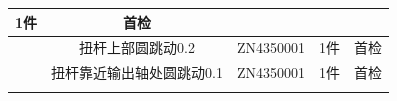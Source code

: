 \documentclass[UTF8]{ctexart}
\begin{document}
\begin{boxedminipage}{184.6mm}
\begin{tabular}{|c|c|c|c|c|}
\parbox[c][][s]{20.58mm}{\raggedright \smallskip 1件\smallskip}&
\parbox[c][][s]{20.58mm}{\raggedright \smallskip 首检\smallskip}\\
\hline
\parbox[c][][s]{9.29mm}{\raggedright {}\smallskip}&
\parbox[c][][s]{77.01mm}{\raggedright \smallskip 扭杆上部圆跳动0.2\smallskip}&
\parbox[c][][s]{43.15mm}{\raggedright \smallskip ZN4350001\smallskip}&
\parbox[c][][s]{20.58mm}{\raggedright \smallskip 1件\smallskip}&
\parbox[c][][s]{20.58mm}{\raggedright \smallskip 首检\smallskip}\\
\hline
\parbox[c][][s]{9.29mm}{\raggedright {}\smallskip}&
\parbox[c][][s]{77.01mm}{\raggedright \smallskip 扭杆靠近输出轴处圆跳动0.1\smallskip}&
\parbox[c][][s]{43.15mm}{\raggedright \smallskip ZN4350001\smallskip}&
\parbox[c][][s]{20.58mm}{\raggedright \smallskip 1件\smallskip}&
\parbox[c][][s]{20.58mm}{\raggedright \smallskip 首检\smallskip}\\
\lasthline
\end{tabular}

\end{boxedminipage}
\end{document}
